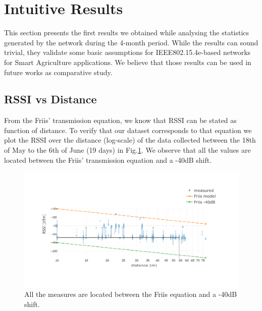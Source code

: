 \documentclass{sig-alternate}
\begin{document}
\section{Intuitive Results}
\label{sec:intuitive}

This section presents the first results we obtained while analysing the statistics generated by the network during the 4-month period.
While the results can sound trivial, they validate some basic assumptions for IEEE802.15.4e-based networks for Smart Agriculture applications.
We believe that those results can be used in future works as comparative study.

\subsection{RSSI vs Distance}
\label{sec:rssi_distance}

From the Friis' transmission equation, we know that RSSI can be stated as function of distance.
To verify that our dataset corresponds to that equation we plot the RSSI over the distance (log-scale) of the data collected between the 18th of May to the 6th of June (19 days) in Fig.\ref{fig:pister_hack}.
We observe that all the values are located between the Friis' transmission equation and a -40dB shift.

\begin{figure}
    \centering
    \includegraphics[width=\columnwidth]{pister_hack}
    \caption{All the measures are located between the Friis equation and a -40dB shift.}
    \label{fig:pister_hack}
\end{figure}

\end{document}
